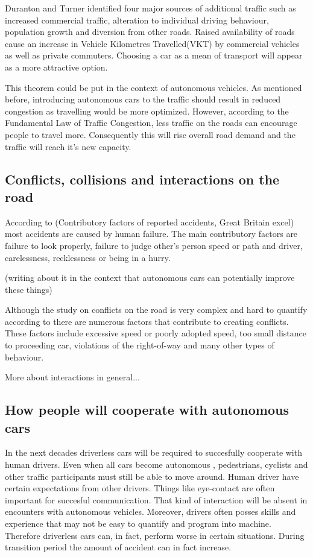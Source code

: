 \documentclass[11pt]{article}
\begin{document}
Duranton and Turner identified four major sources of additional traffic such as increased commercial traffic, alteration to individual driving behaviour, population growth and diversion from other roads. Raised availability of roads cause an increase in Vehicle Kilometres Travelled(VKT) by commercial vehicles as well as private commuters. Choosing a car as a mean of transport will appear as a more attractive option. 


This theorem could be put in the context of autonomous vehicles. As mentioned before, introducing autonomous cars to the traffic should result in reduced congestion as travelling would be more optimized. However, according to the Fundamental Law of Traffic Congestion, less traffic on the roads can encourage people to travel more. Consequently this will rise overall road demand and the traffic will reach it's new capacity.


\subsection{Conflicts, collisions and interactions on the road}


\citep{parkin2016understanding}

According to (Contributory factors of reported accidents, Great Britain excel) most accidents are caused by human failure. The main contributory factors are failure to look properly, failure to judge other's person speed or path and driver, carelessness, recklessness or being in a hurry.



(writing about it in the context that autonomous cars can potentially improve these things) 


Although the study on conflicts on the road is very complex and hard to quantify according to \citep{risser1985behavior} there are numerous factors that contribute to creating conflicts. These factors include excessive speed or poorly adopted speed, too small distance to proceeding car, violations of the right-of-way and many other types of behaviour. 


More about interactions in general...


\subsection{How people will cooperate with autonomous cars}
In the next decades driverless cars will be required to succesfully cooperate with human drivers. Even when all cars become autonomous , pedestrians, cyclists and other traffic participants must still be able to move around. 
Human driver have certain expectations from other drivers. Things like eye-contact are often important for succesful communication. That kind of interaction will be absent in encounters with autonomous vehicles. Moreover, drivers often posses skills and experience that may not be easy to quantify and program into machine. Therefore driverless cars can, in fact, perform worse in certain situations\citep{sivak2015road}. During transition period the amount of accident can in fact increase.
\end{document}
